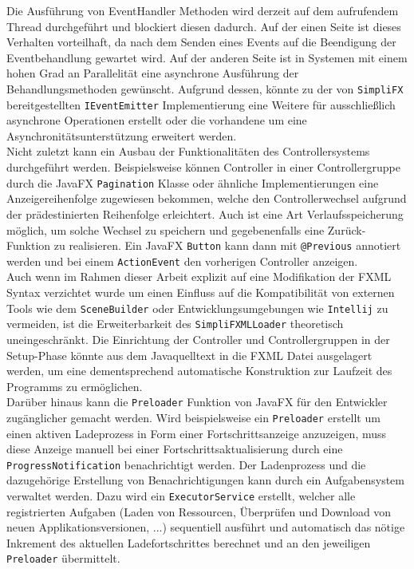 Die Ausführung von EventHandler Methoden wird derzeit auf dem aufrufendem Thread durchgeführt und blockiert diesen dadurch. Auf der einen Seite ist dieses Verhalten vorteilhaft, da nach dem Senden eines Events auf die Beendigung der Eventbehandlung gewartet wird. Auf der anderen Seite ist in Systemen mit einem hohen Grad an Parallelität eine asynchrone Ausführung der Behandlungsmethoden gewünscht. Aufgrund dessen, könnte zu der von \texttt{SimpliFX} bereitgestellten \texttt{IEventEmitter} Implementierung eine Weitere für ausschließlich asynchrone Operationen erstellt oder die vorhandene um eine Asynchronitätsunterstützung erweitert werden.\\
Nicht zuletzt kann ein Ausbau der Funktionalitäten des Controllersystems durchgeführt werden. Beispielsweise können Controller in einer Controllergruppe durch die JavaFX \texttt{Pagination} Klasse oder ähnliche Implementierungen eine Anzeigereihenfolge zugewiesen bekommen, welche den Controllerwechsel aufgrund der prädestinierten Reihenfolge erleichtert. Auch ist eine Art Verlaufsspeicherung möglich, um solche Wechsel zu speichern und gegebenenfalls eine Zurück-Funktion zu realisieren. Ein JavaFX \texttt{Button} kann dann mit \texttt{@Previous} annotiert werden und bei einem \texttt{ActionEvent} den vorherigen Controller anzeigen.\\
Auch wenn im Rahmen dieser Arbeit explizit auf eine Modifikation der FXML Syntax verzichtet wurde um einen Einfluss auf die Kompatibilität von externen Tools wie dem \texttt{SceneBuilder} oder Entwicklungsumgebungen wie \texttt{Intellij} zu vermeiden, ist die Erweiterbarkeit des \texttt{SimpliFXMLLoader} theoretisch uneingeschränkt. Die Einrichtung der Controller und Controllergruppen in der Setup-Phase könnte aus dem Javaquelltext in die FXML Datei ausgelagert werden, um eine dementsprechend automatische Konstruktion zur Laufzeit des Programms zu ermöglichen.\\
Darüber hinaus kann die \texttt{Preloader} Funktion von JavaFX für den Entwickler zugänglicher gemacht werden. Wird beispielsweise ein \texttt{Preloader} erstellt um einen aktiven Ladeprozess in Form einer Fortschrittsanzeige anzuzeigen, muss diese Anzeige manuell bei einer Fortschrittsaktualisierung durch eine \texttt{ProgressNotification} benachrichtigt werden. Der Ladenprozess und die dazugehörige Erstellung von Benachrichtigungen kann durch ein Aufgabensystem verwaltet werden. Dazu wird ein \texttt{ExecutorService} erstellt, welcher alle registrierten Aufgaben (Laden von Ressourcen, Überprüfen und Download von neuen Applikationsversionen, ...) sequentiell ausführt und automatisch das nötige Inkrement des aktuellen Ladefortschrittes berechnet und an den jeweiligen \texttt{Preloader} übermittelt.
